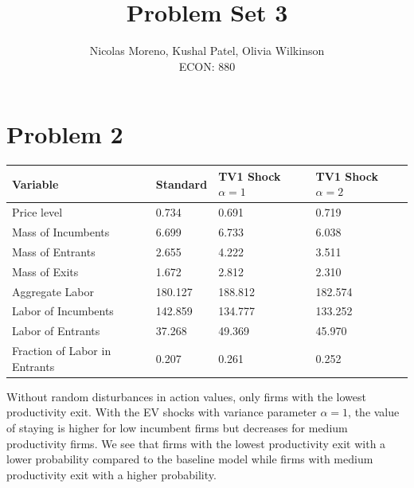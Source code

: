 \documentclass[10pt]{article}
\begin{document}
 
\title{Problem Set 3}
\author{Nicolas Moreno, Kushal Patel, Olivia Wilkinson \\
ECON: 880}
\maketitle

\section{Problem 2}
\begin{table}[!h]
    \centering
    \begin{tabular}{@{}llll@{}}
    \toprule
    \textbf{Variable}             & \textbf{Standard} & \textbf{TV1 Shock $\alpha = 1$} & \textbf{TV1 Shock $\alpha = 2$} \\ \midrule
    Price level                   & 0.734             & 0.691                           & 0.719                           \\
    Mass of Incumbents            & 6.699             & 6.733                           & 6.038                           \\
    Mass of Entrants              & 2.655             & 4.222                           & 3.511                           \\
    Mass of Exits                 & 1.672             & 2.812                           & 2.310                           \\
    Aggregate Labor               & 180.127           & 188.812                         & 182.574                         \\
    Labor of Incumbents           & 142.859           & 134.777                         & 133.252                         \\
    Labor of Entrants             & 37.268            & 49.369                          & 45.970                          \\
    Fraction of Labor in Entrants & 0.207             & 0.261                           & 0.252                           \\ \bottomrule
    \end{tabular}
\end{table}

Without random disturbances in action values, only firms with the lowest productivity exit. With the EV shocks with variance parameter $\alpha = 1$, 
the value of staying is higher for low incumbent firms but decreases for medium productivity firms. We see that firms with the lowest productivity exit with a 
lower probability compared to the baseline model while firms with medium productivity exit with a higher probability. 
\end{document}
